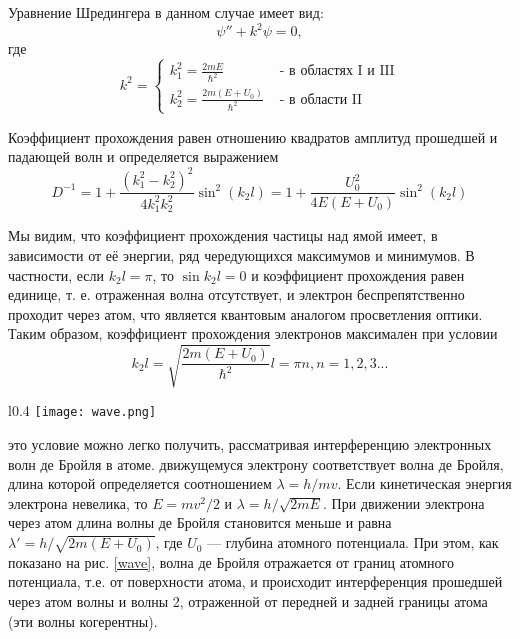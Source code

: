 \documentclass{physlab}
\begin{document}
Уравнение Шредингера в данном случае имеет вид:
\begin{equation}
\psi'' + k^2 \psi = 0, 
\end{equation}
где
\begin{equation}
k^2 = 
\begin{cases}
k_1^2 = \frac{2mE}{\hbar^2} & \text{ - в областях I и III}\\
k_2^2 = \frac{2m(E+U_0)}{\hbar^2} & \text{ - в области II}
\end{cases}
\end{equation}

Коэффициент прохождения равен отношению квадратов амплитуд прошедшей и падающей волн и определяется выражением
\begin{equation}
D^{-1} = 1 + \frac{(k_1^2 - k_2^2)^2}{4k_1^2 k_2^2} \sin^2(k_2l) = 1 + \frac{U_0^2}{4E(E+U_0)} \sin^2(k_2l)
\end{equation}

Мы видим, что коэффициент прохождения частицы над ямой имеет, в зависимости от её энергии, ряд чередующихся максимумов и минимумов. В частности, если $k_2l = \pi$, то $\sin k_2l = 0$ и коэффициент прохождения равен единице, т. е. отраженная волна отсутствует, и электрон беспрепятственно проходит через атом, что является квантовым аналогом просветления оптики.
Таким образом, коэффициент прохождения электронов максимален при условии 
\[ k_2l = \sqrt{\frac{2m(E+U_0)}{\hbar^2}}l = \pi n, n = 1, 2, 3... \]

\begin{wrapfigure}{l}{0.4\linewidth} 
\centering
    \texttt{[image: wave.png]}
\caption{Схема интерференции волн де Бройля при рассеянии на атоме}
\label{wave}
\end{wrapfigure}

это условие можно легко получить, рассматривая интерференцию электронных волн де Бройля в атоме. движущемуся электрону соответствует волна де Бройля, длина которой определяется соотношением $\lambda  = h/mv$. Если кинетическая энергия электрона невелика, то $E = mv^2/2$ и $\lambda = h/\sqrt{2mE}$. При движении электрона через атом длина волны де Бройля становится меньше и равна $\lambda' = h/\sqrt{2m(E + U_0)}$, где $U_0$ — глубина атомного потенциала. При этом, как показано на рис. \ref{wave}, волна де Бройля отражается от границ атомного потенциала, т.е. от поверхности атома, и происходит интерференция прошедшей через атом волны и волны 2, отраженной от передней и задней границы атома (эти волны когерентны).
\end{document}
